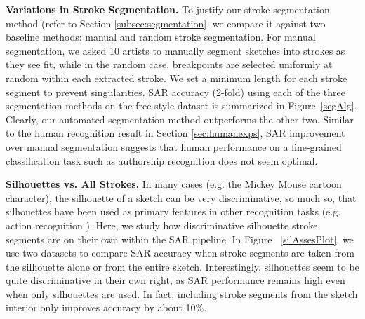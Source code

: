 \noindent\textbf{Variations in Stroke Segmentation.} To justify our stroke segmentation method (refer to Section \ref{subsec:segmentation}, we compare it against two baseline methods: manual and random stroke segmentation.
For manual segmentation, we asked 10 artists to manually segment sketches into strokes as they see fit, while in the random case, breakpoints are selected uniformly at random within each extracted stroke. We set a minimum length for each stroke segment to prevent singularities. SAR accuracy (2-fold) using each of the three segmentation methods on the free style dataset is summarized in Figure~\ref{segAlg}. Clearly, our automated segmentation method outperforms the other two. Similar to the human recognition result in Section \ref{sec:humanexps}, SAR improvement over manual segmentation suggests that human performance on a fine-grained classification task such as authorship recognition does not seem optimal.



\noindent\textbf{Silhouettes vs. All Strokes.} In many cases (e.g. the Mickey Mouse cartoon character), the silhouette of a sketch can be very discriminative, so much so, that silhouettes have been used as primary features in other recognition tasks (e.g. action recognition \cite{li2008expandable}). Here, we study how discriminative silhouette stroke segments are on their own within the SAR pipeline. In Figure ~\ref{silAssesPlot}, we use two datasets to compare SAR accuracy when stroke segments are taken from the silhouette alone or from the entire sketch. Interestingly, silhouettes seem to be quite discriminative in their own right, as SAR performance remains high even when only silhouettes are used. In fact, including stroke segments from the sketch interior only improves accuracy by about 10\%.

